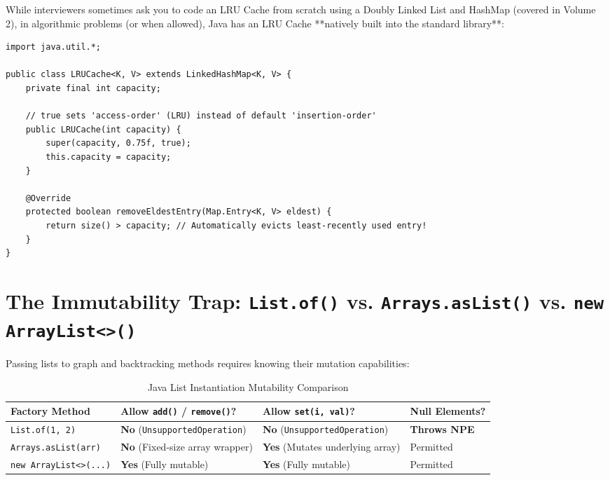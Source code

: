 \documentclass[10pt,journal,compsoc,onecolumn]{IEEEtran}
\begin{document}
While interviewers sometimes ask you to code an LRU Cache from scratch using a Doubly Linked List and HashMap (covered in Volume 2), in algorithmic problems (or when allowed), Java has an LRU Cache **natively built into the standard library**:

\begin{verbatim}
import java.util.*;

public class LRUCache<K, V> extends LinkedHashMap<K, V> {
    private final int capacity;

    // true sets 'access-order' (LRU) instead of default 'insertion-order'
    public LRUCache(int capacity) {
        super(capacity, 0.75f, true);
        this.capacity = capacity;
    }

    @Override
    protected boolean removeEldestEntry(Map.Entry<K, V> eldest) {
        return size() > capacity; // Automatically evicts least-recently used entry!
    }
}
\end{verbatim}

\section{The Immutability Trap: \texttt{List.of()} vs. \texttt{Arrays.asList()} vs. \texttt{new ArrayList<>()}}
\label{sec:list_traps}

Passing lists to graph and backtracking methods requires knowing their mutation capabilities:

\begin{table}[htbp]
\caption{Java List Instantiation Mutability Comparison}
\label{tab:list_mutability}
\centering
\begin{tabular}{lp{3.5cm}p{4.0cm}p{3.5cm}}
\toprule
\textbf{Factory Method} & \textbf{Allow \texttt{add()} / \texttt{remove()}?} & \textbf{Allow \texttt{set(i, val)}?} & \textbf{Null Elements?} \\
\midrule
\texttt{List.of(1, 2)} & \textbf{No} (\texttt{UnsupportedOperation}) & \textbf{No} (\texttt{UnsupportedOperation}) & \textbf{Throws NPE} \\
\texttt{Arrays.asList(arr)} & \textbf{No} (Fixed-size array wrapper) & \textbf{Yes} (Mutates underlying array) & Permitted \\
\texttt{new ArrayList<>(...)} & \textbf{Yes} (Fully mutable) & \textbf{Yes} (Fully mutable) & Permitted \\
\bottomrule
\end{tabular}
\end{table}
\end{document}
